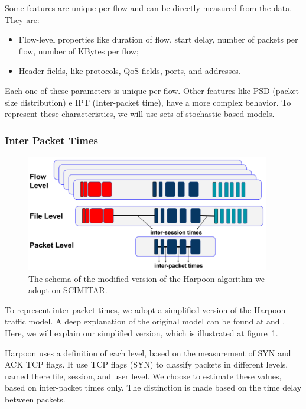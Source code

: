 Some features are unique per flow and can be directly measured from the data. They are:  


\begin{itemize}
\item Flow-level properties like duration of flow, start delay, number of packets per flow, number of KBytes per flow; 
\item Header fields, like protocols, QoS fields, ports, and addresses.
\end{itemize}


Each one of these parameters is unique per flow. Other features like PSD (packet size distribution) e IPT (Inter-packet time), have a more complex behavior.  To represent these characteristics, we will use sets of stochastic-based models.  


\subsubsection{Inter Packet Times}

\begin{figure}[ht!]
    \centering
    \includegraphics[height=2.0in]{figures/ch3/modified-harpoon-model}
    \caption{The schema of the modified version of the Harpoon algorithm we adopt on SCIMITAR.}
    \label{fig:modified-harpoon-model}
\end{figure}

To represent inter packet times, we adopt a simplified version of the Harpoon traffic model. A deep explanation of the original model can be found at \cite{harpoon-paper} and \cite{harpoon-validation}. Here, we will explain our simplified version, which is illustrated at figure~\ref{fig:modified-harpoon-model}. 


Harpoon uses a definition of each level, based on the measurement of SYN and ACK TCP flags. It use TCP flags (SYN) to classify packets in different levels, named there file, session, and user level. We choose to estimate these values, based on inter-packet times only. The distinction is made based on the time delay between packets.



